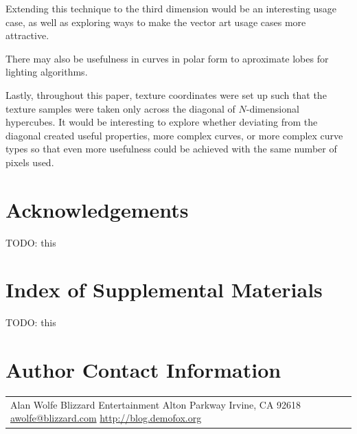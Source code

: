 \documentclass{jcgt}
\begin{document}
Extending this technique to the third dimension would be an interesting usage case, as well as exploring ways to make the vector art usage cases more attractive.

There may also be usefulness in curves in polar form to aproximate lobes for lighting algorithms.

Lastly, throughout this paper, texture coordinates were set up such that the texture samples were taken only across the diagonal of $N$-dimensional hypercubes.  It would be interesting to explore whether deviating from the diagonal created useful properties, more complex curves, or more complex curve types so that even more usefulness could be achieved with the same number of pixels used.

\section*{Acknowledgements}
\label{sec:acknowledgements}
TODO: this


\small



\section*{Index of Supplemental Materials}
\label{sec:indexofsupplementalmaterials}
TODO: this


\section*{Author Contact Information}

\hspace{-2mm}\begin{tabular}{p{}p{}}
Alan Wolfe \newline
Blizzard Entertainment \newline
16215 Alton Parkway \newline
Irvine, CA 92618 \newline
\href{mailto:awolfe@blizzard.com}{awolfe@blizzard.com}
\href{http://blog.demofox.org}{http://blog.demofox.org}
\end{tabular}


\afterdoc
\end{document}
